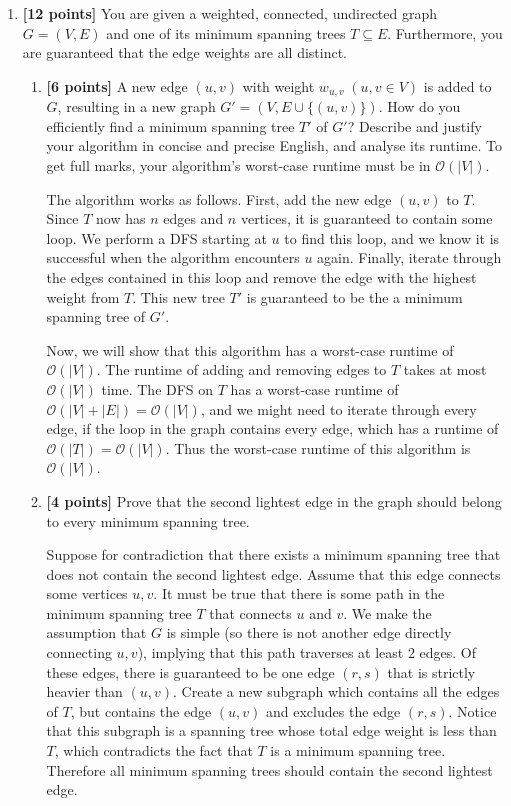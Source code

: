 \documentclass{assignment-263}
\begin{document}
\think
\begin{enumerate}
\item \textbf{[12 points]}
	You are given a weighted, connected, undirected graph $G=(V, E)$ and
    one of its minimum spanning trees $T\subseteq E$. Furthermore, you are guaranteed that the edge weights are all distinct.

    \begin{enumerate}
      \item \textbf{[6 points]}
        A new edge $(u, v)$ with weight $w_{u, v}\;(u, v\in V)$ is
        added to $G$, resulting in a new graph $G'=(V, E\cup \{(u,
        v)\})$. How do you efficiently find a minimum spanning tree
        $T'$ of $G'$? Describe and justify your algorithm in concise
        and precise English, and analyse its runtime. To get full
        marks, your algorithm's worst-case runtime must be in
        $\mathcal{O}(|V|)$.

      The algorithm works as follows. First, add the new edge \((u,v)\) to \(T\). Since \(T\) now has \(n\) edges and \(n\) vertices, it is guaranteed to contain some loop. We perform a DFS starting at \(u\) to find this loop, and we know it is successful when the algorithm encounters \(u\) again. Finally, iterate through the edges contained in this loop and remove the edge with the highest weight from \(T\). This new tree \(T'\) is guaranteed to be the a minimum spanning tree of \(G'\).

      Now, we will show that this algorithm has a worst-case runtime of \(\mathcal{O} (|V|)\). The runtime of adding and removing edges to \(T\) takes at most \(\mathcal{O} (|V|)\) time. The DFS on \(T\) has a worst-case runtime of \(\mathcal{O} (|V| + |E|) = \mathcal{O} (|V|)\), and we might need to iterate through every edge, if the loop in the graph contains every edge, which has a runtime of \(\mathcal{O} (|T|) = \mathcal{O} (|V|)\). Thus the worst-case runtime of this algorithm is \(\mathcal{O} (|V|)\).

      \item \textbf{[4 points]} Prove that the second lightest edge in the graph should belong to every minimum spanning tree.
      
      Suppose for contradiction that there exists a minimum spanning tree that does not contain the second lightest edge. Assume that this edge connects some vertices \(u,v\). It must be true that there is some path in the minimum spanning tree \(T\) that connects \(u\) and \(v\). We make the assumption that \(G\) is simple (so there is not another edge directly connecting \(u,v\)), implying that this path traverses at least \(2\) edges. Of these edges, there is guaranteed to be one edge \((r,s)\) that is strictly heavier than \((u,v)\). Create a new subgraph which contains all the edges of \(T\), but contains the edge \((u,v)\) and excludes the edge \((r,s)\). Notice that this subgraph is a spanning tree whose total edge weight is less than \(T\), which contradicts the fact that \(T\) is a minimum spanning tree. Therefore all minimum spanning trees should contain the second lightest edge.
      

\end{enumerate}
\end{enumerate}
\end{document}
